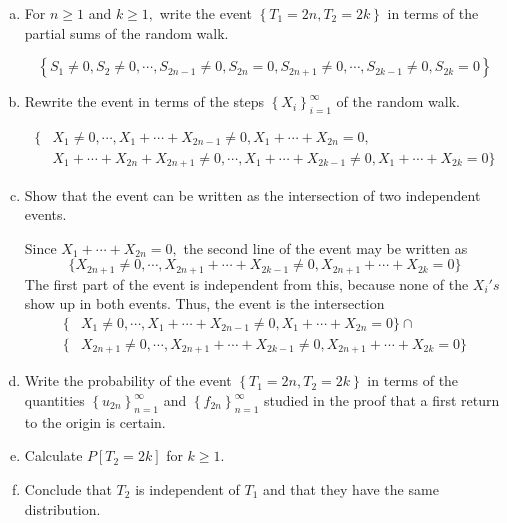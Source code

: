 \documentclass{article}
\begin{document}
\begin{enumerate}[(a)]
	\item For $n\ge 1$ and $k\ge 1,$ write the event $\left\{ T_1=2n, T_2=2k \right\}$ in terms of the partial sums of the random walk.
		\begin{answer*}
			\[\left\{ S_1\neq 0, S_2\neq 0, \cdots, S_{2n-1}\neq 0, S_{2n}=0, S_{2n+1}\neq 0, \cdots, S_{2k-1}\neq 0, S_{2k}=0 \right\}\]
		\end{answer*}

	\item Rewrite the event in terms of the steps $\left\{ X_i \right\}_{i=1}^\infty$ of the random walk.
		\begin{answer*}
			\begin{align*}
				\{ &X_1\neq 0, \cdots, X_1+\cdots+X_{2n-1}\neq 0, X_1+\cdots+X_{2n}=0, \\
				&X_1+\cdots + X_{2n}+X_{2n+1}\neq 0, \cdots, X_1+\cdots+X_{2k-1}\neq 0, X_1+\cdots + X_{2k}=0 \}
			\end{align*}
		\end{answer*}

	\item Show that the event can be written as the intersection of two independent events.
		\begin{soln}
			Since $X_1+\cdots+X_{2n}=0,$ the second line of the event may be written as
			\[\{X_{2n+1}\neq 0, \cdots, X_{2n+1}+\cdots+X_{2k-1}\neq 0, X_{2n+1}+\cdots+X_{2k}=0\}\]
			The first part of the event is independent from this, because none of the $X_i's$ show up in both events. Thus, the event is the intersection
			\begin{align*}
				\{ &X_1\neq 0, \cdots, X_1+\cdots+X_{2n-1}\neq 0, X_1+\cdots+X_{2n}=0\} \cap \\
				\{&X_{2n+1}\neq 0, \cdots, X_{2n+1}+\cdots+X_{2k-1}\neq 0, X_{2n+1}+\cdots + X_{2k}=0 \}
			\end{align*}
		\end{soln}

	\item Write the probability of the event $\left\{ T_1=2n, T_2=2k \right\}$ in terms of the quantities $\left\{ u_{2n} \right\}_{n=1}^\infty$ and $\left\{ f_{2n} \right\}_{n=1}^\infty$ studied in the proof that a first return to the origin is certain.

	\item Calculate $P[T_2=2k]$ for $k\ge1.$

	\item Conclude that $T_2$ is independent of $T_1$ and that they have the same distribution.


\end{enumerate}
\end{document}
